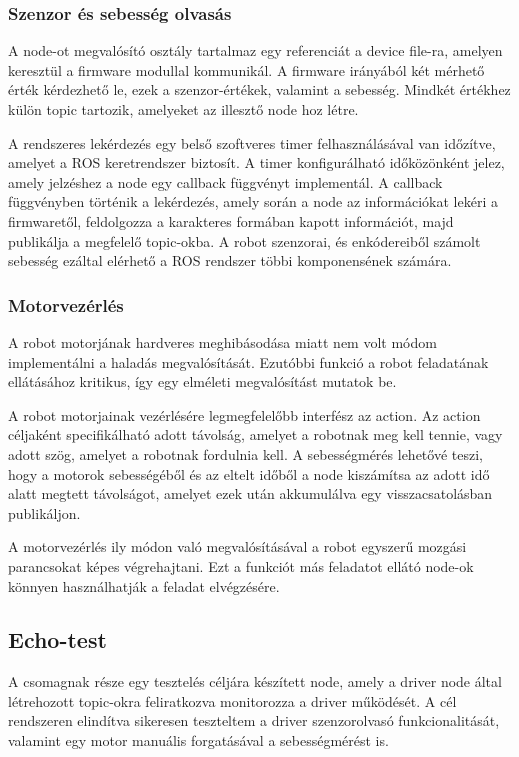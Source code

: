 \subsubsection{Szenzor és sebesség olvasás}
A node-ot megvalósító osztály tartalmaz egy referenciát a device file-ra, amelyen
keresztül a firmware modullal kommunikál. A firmware irányából két mérhető érték
kérdezhető le, ezek a szenzor-értékek, valamint a sebesség. Mindkét értékhez
külön topic tartozik, amelyeket az illesztő node hoz létre.

A rendszeres lekérdezés egy belső szoftveres timer felhasználásával van időzítve,
amelyet a ROS keretrendszer biztosít. A timer konfigurálható időközönként jelez,
amely jelzéshez a node egy callback függvényt implementál. A callback függvényben
történik a lekérdezés, amely során a node az információkat lekéri a firmwaretől,
feldolgozza a karakteres formában kapott információt, majd publikálja a megfelelő
topic-okba. A robot szenzorai, és enkódereiből számolt sebesség ezáltal elérhető
a ROS rendszer többi komponensének számára.

\subsubsection{Motorvezérlés}

A robot motorjának hardveres meghibásodása miatt nem volt módom
implementálni a haladás megvalósítását. Ezutóbbi funkció a robot feladatának
ellátásához kritikus, így egy elméleti megvalósítást mutatok be.

A robot motorjainak vezérlésére legmegfelelőbb interfész az action.
Az action céljaként specifikálható adott távolság, amelyet a robotnak meg kell
tennie, vagy adott szög, amelyet a robotnak fordulnia kell. A sebességmérés
lehetővé teszi, hogy a motorok sebességéből és az eltelt időből a node kiszámítsa
az adott idő alatt megtett távolságot, amelyet ezek után akkumulálva egy
visszacsatolásban publikáljon.

A motorvezérlés ily módon való megvalósításával a robot egyszerű mozgási
parancsokat képes végrehajtani. Ezt a funkciót más feladatot ellátó node-ok
könnyen használhatják a feladat elvégzésére.

\subsection{Echo-test}

A csomagnak része egy tesztelés céljára készített node, amely a driver node által
létrehozott topic-okra feliratkozva monitorozza a driver működését. A cél
rendszeren elindítva sikeresen teszteltem a driver szenzorolvasó
funkcionalitását, valamint egy motor manuális forgatásával a sebességmérést is.


